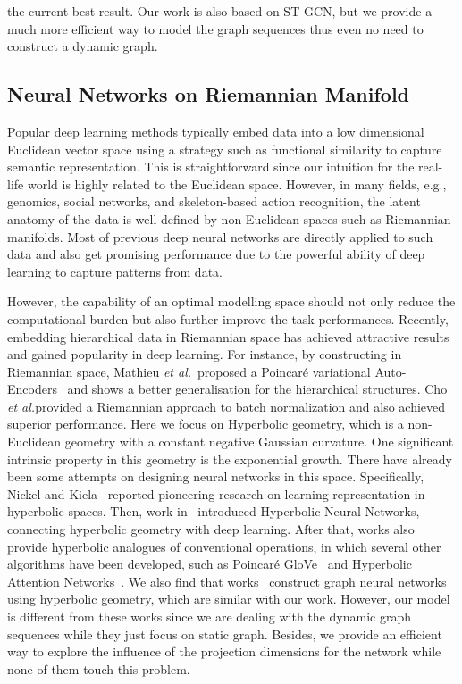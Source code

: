 \documentclass[letterpaper]{article} \usepackage{aaai19}  \usepackage{times}  \usepackage{helvet} \usepackage{courier}  \usepackage[hyphens]{url}  \usepackage{graphicx} \urlstyle{rm} \def\UrlFont{\rm}  \usepackage{graphicx}  \frenchspacing  \setlength{\pdfpagewidth}{8.5in}  \setlength{\pdfpageheight}{11in}
\def\etal{\emph{et al.}}
\begin{document}
the current best result. Our work is also based on ST-GCN, but we provide a much more efficient way to model the graph sequences thus even no need to construct a dynamic graph.
\vspace{-1em}
\subsection{Neural Networks on Riemannian Manifold}

Popular deep learning methods typically embed  data into a low dimensional Euclidean vector space using a strategy such as functional similarity to capture semantic representation. This is straightforward since our intuition for the real-life world is highly related to the Euclidean space. However, in many fields, e.g.,  genomics, social networks, and skeleton-based action recognition, the latent anatomy of the data is well defined by non-Euclidean spaces such as Riemannian manifolds. Most of previous deep neural networks are directly applied to such data and also get promising performance due to the powerful ability of deep learning to capture patterns from data.

However, the capability of an optimal modelling space should not only reduce the computational burden but also further improve the task performances. Recently, embedding hierarchical data in Riemannian space has achieved attractive results and gained popularity in deep learning. For instance, by constructing in Riemannian space, Mathieu \etal ~proposed a Poincar\'e variational Auto-Encoders~\cite{mathieu2019continuous} and shows a better generalisation for the hierarchical structures. Cho \etal provided a Riemannian approach to batch normalization\cite{cho2017riemannian} and also achieved superior performance. Here we focus on Hyperbolic geometry, which is a non-Euclidean geometry with a constant negative Gaussian curvature. One significant intrinsic property in this geometry is the exponential growth. There have already been some attempts on designing neural networks in this space. Specifically, Nickel and Kiela~\cite{nickel2017poincare} reported pioneering research on learning representation in hyperbolic spaces. Then, work in~\cite{ganea2018hyperbolic} introduced Hyperbolic Neural Networks, connecting hyperbolic geometry with deep learning. After that, works also provide hyperbolic analogues of conventional operations, in which several other algorithms have been developed, such as Poincar\'e GloVe~\cite{tifrea2018poincar} and Hyperbolic Attention Networks~\cite{gulcehre2018hyperbolic}. We also find that works~\cite{liu2019hyperbolic,chami2019hyperbolic} construct graph neural networks using hyperbolic geometry, which are similar with our work. However, our model is different from these works since we are dealing with the dynamic graph sequences while they just focus on static graph. Besides, we provide an efficient way to explore the influence of the projection dimensions for the network while none of them touch this problem.
\end{document}
